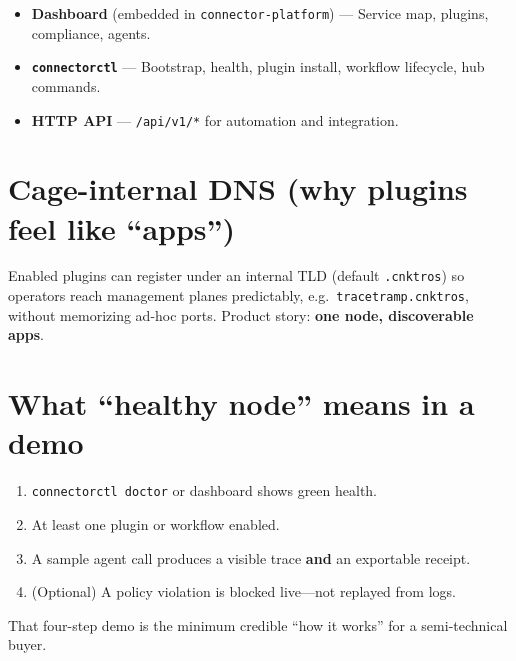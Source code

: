 \begin{itemize}
  \item \textbf{Dashboard} (embedded in \texttt{connector-platform}) --- Service map, plugins, compliance, agents.
  \item \textbf{\texttt{connectorctl}} --- Bootstrap, health, plugin install, workflow lifecycle, hub commands.
  \item \textbf{HTTP API} --- \texttt{/api/v1/*} for automation and integration.
\end{itemize}

\section{Cage-internal DNS (why plugins feel like ``apps'')}

Enabled plugins can register under an internal TLD (default \texttt{.cnktros}) so operators reach management planes predictably, e.g.\ \texttt{tracetramp.cnktros}, without memorizing ad-hoc ports. Product story: \textbf{one node, discoverable apps}.

\section{What ``healthy node'' means in a demo}

\begin{enumerate}
  \item \texttt{connectorctl doctor} or dashboard shows green health.
  \item At least one plugin or workflow enabled.
  \item A sample agent call produces a visible trace \textbf{and} an exportable receipt.
  \item (Optional) A policy violation is blocked live---not replayed from logs.
\end{enumerate}

That four-step demo is the minimum credible ``how it works'' for a semi-technical buyer.
